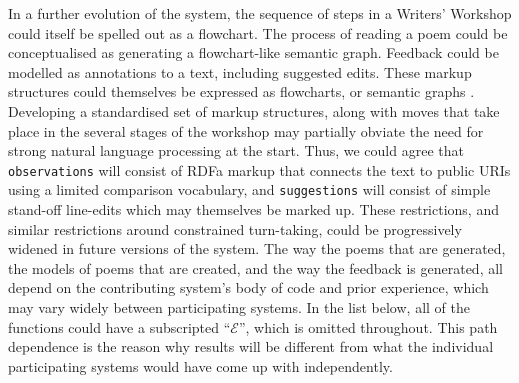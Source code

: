 In a further evolution of the system, the sequence of steps in a
Writers' Workshop could itself be spelled out as a flowchart.  The
process of reading a poem could be conceptualised as generating a
flowchart-like semantic graph.  Feedback could be modelled as
annotations to a text, including suggested edits.  These markup
structures could themselves be expressed as flowcharts, or semantic
graphs \cite{harrington2007asknet,francisco2006automated}.  Developing a standardised set of markup structures, along
with moves that take place in the several stages of the workshop may
partially obviate the need for strong natural language processing at
the start.  Thus, we could agree that {\tt observations} will consist
of RDFa markup that connects the text to public URIs using a limited
comparison vocabulary, and {\tt suggestions} will consist of simple
stand-off line-edits which may themselves be marked up.  These
restrictions, and similar restrictions around constrained turn-taking,
could be progressively widened in future versions of the system.
%
The way the poems that are generated, the models of poems that are
created, and the way the feedback is generated, all depend on the
contributing system's body of code and prior experience, which may
vary widely between participating systems.  In the list below, all of
the functions could have a subscripted ``$\mathcal{E}$'', which is
omitted throughout.  This path dependence is the reason why results
will be different from what the individual participating systems would
have come up with independently.


